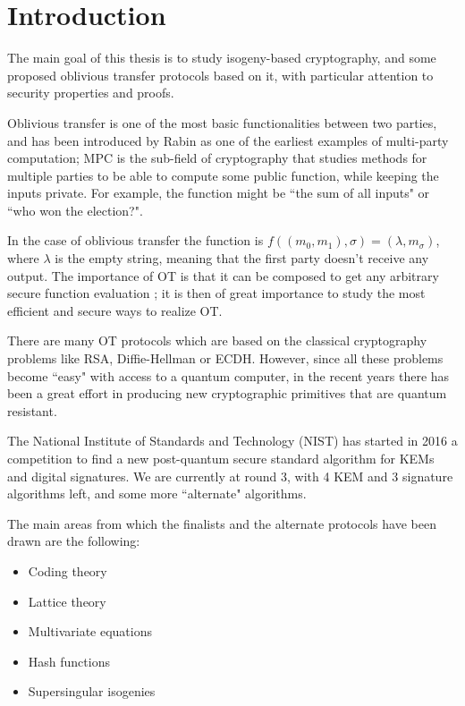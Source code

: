 \chapter*{Introduction}

The main goal of this thesis is to study isogeny-based cryptography, and some proposed oblivious transfer protocols based on it, with particular attention to security properties and proofs.

Oblivious transfer is one of the most basic functionalities between two parties, and has been introduced by Rabin \cite{Rabin_OT} as one of the earliest examples of multi-party computation; MPC is the sub-field of cryptography that studies methods for multiple parties to be able to compute some public function, while keeping the inputs private. For example, the function might be ``the sum of all inputs" or ``who won the election?".

In the case of oblivious transfer the function is $f((m_0,m_1),\sigma)=(\lambda,m_\sigma)$, where $\lambda$ is the empty string, meaning that the first party doesn't receive any output. The importance of OT is that it can be composed to get any arbitrary secure function evaluation \cite{GMW}; it is then of great importance to study the most efficient and secure ways to realize OT.

There are many OT protocols which are based on the classical cryptography problems like RSA, Diffie-Hellman or ECDH. However, since all these problems become ``easy" with access to a quantum computer, in the recent years there has been a great effort in producing new cryptographic primitives that are quantum resistant.

The National Institute of Standards and Technology (NIST) has started in 2016 a competition to find a new post-quantum secure standard algorithm for KEMs and digital signatures. We are currently at round 3, with 4 KEM and 3 signature algorithms left, and some more ``alternate" algorithms.

The main areas from which the finalists and the alternate protocols have been drawn are the following:
\begin{itemize}
    \item Coding theory
    \item Lattice theory
    \item Multivariate equations
    \item Hash functions
    \item Supersingular isogenies
\end{itemize}

